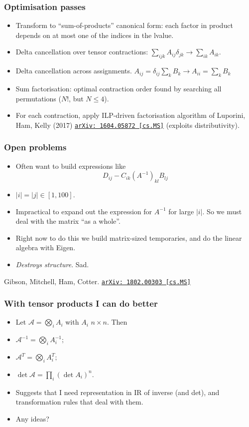 \documentclass[presentation]{beamer}
\newcommand{\arxivlink}[2]{%
  \href{http://www.arxiv.org/abs/#1}%
  {\texttt{arXiv:\,#1\,[#2]}}%
}
\begin{document}
\begin{frame}
  \frametitle{Optimisation passes}
  \begin{itemize}
  \item Transform to ``sum-of-products''
    canonical form: each factor in product depends on at most one of
    the indices in the lvalue.
  \item Delta cancellation over tensor contractions: $\sum_{ijk} A_{ij}
    \delta_{jk} \to \sum_{ik} A_{ik}$.
  \item Delta cancellation across assignments.  $A_{ij} = \delta_{ij}
    \sum_k B_k \to A_{ii} = \sum_k B_k$
  \item Sum factorisation: optimal contraction order found by
    searching all permutations ($N!$, but $N\le 4$).
  \item For each contraction, apply ILP-driven factorisation algorithm of
    {\footnotesize Luporini, Ham, Kelly (2017) \arxivlink{1604.05872}{cs.MS}}
    (exploits distributivity).
  \end{itemize}
\end{frame}
\begin{frame}
  \frametitle{Open problems}
  \begin{itemize}
  \item Often want to build expressions like
    \begin{equation*}
      D_{ij} - C_{ik} (A^{-1})_{k l} B_{l j}
    \end{equation*}
  \item $|i| = |j| \in [1, 100]$.
  \item Impractical to expand out the expression for $A^{-1}$ for
    large $|i|$.  So we must deal with the matrix ``as a whole''.
  \item Right now to do this we build matrix-sized temporaries, and do
    the linear algebra with Eigen.
  \item \emph{Destroys structure}.  Sad.
  \end{itemize}
    \begin{flushright}
      {\footnotesize Gibson, Mitchell, Ham, Cotter. \arxivlink{1802.00303}{cs.MS}}
    \end{flushright}
\end{frame}

\begin{frame}
  \frametitle{With tensor products I can do better}
  \begin{itemize}
  \item   Let $\mathcal{A} = \bigotimes_i A_i$
    with $A_i$ $n\times n$.  Then
    \item
      $\mathcal{A}^{-1} = \bigotimes_i A_i^{-1};$
    \item
      $\mathcal{A}^T = \bigotimes_i A_i^T;$
    \item
      $\det \mathcal{A} = \prod_i (\det A_i)^n.$
    \item Suggests that I need representation in IR of inverse (and
      det), and transformation rules that deal with them.
    \item Any ideas?
    \end{itemize}
\end{frame}
\end{document}
